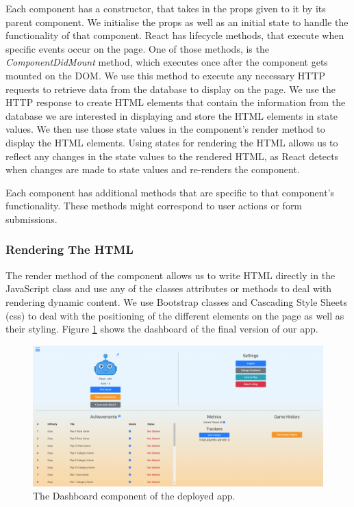 \documentclass{l4proj}
\begin{document}
Each component has a constructor, that takes in the props given to it by its parent component. We initialise the props as well as an initial state to handle the functionality of that component. React has lifecycle methods, that execute when specific events occur on the page. One of those methods, is the \textit{ComponentDidMount} method, which executes once after the component gets mounted on the DOM. We use this method to execute any necessary HTTP requests to retrieve data from the database to display on the page. We use the HTTP response to create HTML elements that contain the information from the database we are interested in displaying and store the HTML elements in state values. We then use those state values in the component's render method to display the  HTML elements. Using states for rendering the HTML allows us to reflect any changes in the state values to the rendered HTML, as React detects when changes are made to state values and re-renders the component.

Each component has additional methods that are specific to that component's functionality. These methods might correspond to user actions or form submissions.

\subsubsection{Rendering The HTML}
The render method of the component allows us to write HTML directly in the JavaScript class and use any of the classes attributes or methods to deal with rendering dynamic content. We use Bootstrap classes and Cascading Style Sheets (css) to deal with the positioning of the different elements on the page as well as their styling. Figure \ref{fig:dash_deploy} shows the dashboard of the final version of our app. 

\begin{figure}
    \centering
    \includegraphics[width=1\linewidth]{images/dash_deploy.png}    

    \caption{The Dashboard component of the deployed app.}

    \label{fig:dash_deploy} 
\end{figure}
\end{document}
